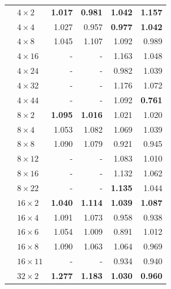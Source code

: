 \begin{table}[H]
\begin{tabular}{llrrrr}
 & $4 \times 2$ & \textbf{1.017} & \textbf{0.981} & \textbf{1.042} & \textbf{1.157} \\
 & $4 \times 4$ & 1.027 & 0.957 & \textbf{0.977} & \textbf{1.042} \\
 & $4 \times 8$ & 1.045 & 1.107 & 1.092 & 0.989 \\
 & $4 \times 16$ & - & - & 1.163 & 1.048 \\
 & $4 \times 24$ & - & - & 0.982 & 1.039 \\
 & $4 \times 32$ & - & - & 1.176 & 1.072 \\
 & $4 \times 44$ & - & - & 1.092 & \textbf{0.761} \\
 & $8 \times 2$ & \textbf{1.095} & \textbf{1.016} & 1.021 & 1.020 \\
 & $8 \times 4$ & 1.053 & 1.082 & 1.069 & 1.039 \\
 & $8 \times 8$ & 1.090 & 1.079 & 0.921 & 0.945 \\
 & $8 \times 12$ & - & - & 1.083 & 1.010 \\
 & $8 \times 16$ & - & - & 1.132 & 1.062 \\
 & $8 \times 22$ & - & - & \textbf{1.135} & 1.044 \\
 & $16 \times 2$ & \textbf{1.040} & \textbf{1.114} & \textbf{1.039} & \textbf{1.087} \\
 & $16 \times 4$ & 1.091 & 1.073 & 0.958 & 0.938 \\
 & $16 \times 6$ & 1.054 & 1.009 & 0.891 & 1.012 \\
 & $16 \times 8$ & 1.090 & 1.063 & 1.064 & 0.969 \\
 & $16 \times 11$ & - & - & 0.934 & 0.940 \\
 & $32 \times 2$ & \textbf{1.277} & \textbf{1.183} & \textbf{1.030} & \textbf{0.960} \\

\end{tabular}
\end{table}

